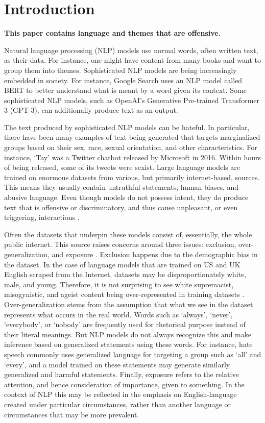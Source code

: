 \documentclass[12pt,]{article}
\begin{document}
\vskip 6.5pt


\noindent  \hypertarget{introduction}{%
\section{Introduction}\label{introduction}}

\textbf{This paper contains language and themes that are offensive.}

Natural language processing (NLP) models use normal words, often written text, as their data. For instance, one might have content from many books and want to group them into themes. Sophisticated NLP models are being increasingly embedded in society. For instance, Google Search uses an NLP model called BERT to better understand what is meant by a word given its context. Some sophisticated NLP models, such as OpenAI's Generative Pre-trained Transformer 3 (GPT-3), can additionally produce text as an output.

The text produced by sophisticated NLP models can be hateful. In particular, there have been many examples of text being generated that targets marginalized groups based on their sex, race, sexual orientation, and other characteristics. For instance, `Tay' was a Twitter chatbot released by Microsoft in 2016. Within hours of being released, some of its tweets were sexist. Large language models are trained on enormous datasets from various, but primarily internet-based, sources. This means they usually contain untruthful statements, human biases, and abusive language. Even though models do not possess intent, they do produce text that is offensive or discriminatory, and thus cause unpleasant, or even triggering, interactions \citep{bender2021dangers}.

Often the datasets that underpin these models consist of, essentially, the whole public internet. This source raises concerns around three issues: exclusion, over-generalization, and exposure \citep{hovy2016social}. Exclusion happens due to the demographic bias in the dataset. In the case of language models that are trained on US and UK English scraped from the Internet, datasets may be disproportionately white, male, and young. Therefore, it is not surprising to see white supremacist, misogynistic, and ageist content being over-represented in training datasets \citep{bender2021dangers}. Over-generalization stems from the assumption that what we see in the dataset represents what occurs in the real world. Words such as `always', `never', `everybody', or `nobody' are frequently used for rhetorical purpose instead of their literal meanings. But NLP models do not always recognize this and make inference based on generalized statements using these words. For instance, hate speech commonly uses generalized language for targeting a group such as `all' and `every', and a model trained on these statements may generate similarly generalized and harmful statements. Finally, exposure refers to the relative attention, and hence consideration of importance, given to something. In the context of NLP this may be reflected in the emphasis on English-language created under particular circumstances, rather than another language or circumstances that may be more prevalent.
\end{document}
